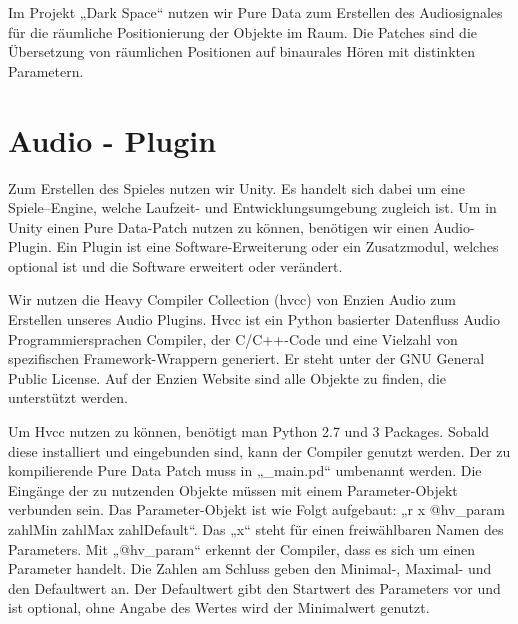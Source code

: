 \documentclass[a4paper, 11pt]{scrartcl}
\begin{document}
Im Projekt „Dark Space“ nutzen wir Pure Data zum Erstellen des Audiosignales für
die räumliche Positionierung der Objekte im Raum. Die Patches sind die
Übersetzung von räumlichen Positionen auf binaurales Hören mit distinkten
Parametern. 

\section{Audio - Plugin} \label{sec:Audio - Plugin}

Zum Erstellen des Spieles nutzen wir Unity. Es handelt sich dabei um eine
Spiele–Engine, welche Laufzeit- und Entwicklungsumgebung zugleich ist. Um in
Unity einen Pure Data-Patch nutzen zu können, benötigen wir einen Audio-Plugin.
Ein Plugin ist eine Software-Erweiterung oder ein Zusatzmodul, welches optional
ist und die Software erweitert oder verändert. 

Wir nutzen die Heavy Compiler Collection (hvcc) von Enzien Audio zum Erstellen
unseres Audio Plugins.  Hvcc ist ein Python basierter
Datenfluss Audio Programmiersprachen Compiler, der C/C++-Code und eine Vielzahl
von spezifischen Framework-Wrappern generiert. Er steht unter der GNU General
Public License. Auf der Enzien Website sind alle Objekte zu finden, die
unterstützt werden. 

Um Hvcc nutzen zu können, benötigt man Python 2.7 und 3 Packages. Sobald diese
installiert und eingebunden sind, kann der Compiler genutzt werden. Der zu
kompilierende Pure Data Patch muss in „\_main.pd“ umbenannt werden. Die Eingänge
der zu nutzenden Objekte müssen mit einem Parameter-Objekt verbunden sein. Das
Parameter-Objekt ist wie Folgt aufgebaut: „r x @hv\_param zahlMin zahlMax
zahlDefault“. Das „x“ steht für einen freiwählbaren Namen des Parameters. Mit
„@hv\_param“ erkennt der Compiler, dass es sich um einen Parameter handelt. Die
Zahlen am Schluss geben den Minimal-, Maximal- und den Defaultwert an. Der
Defaultwert gibt den Startwert des Parameters vor und ist optional, ohne Angabe
des Wertes wird der Minimalwert genutzt. 
\end{document}
